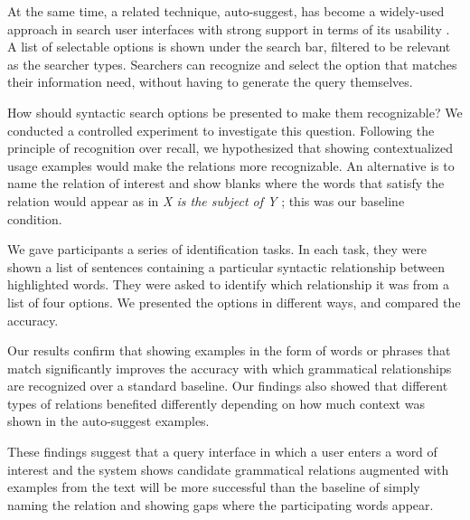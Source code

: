 At the same time, a related technique, auto-suggest, has become a widely-used approach in search user interfaces with strong support in terms of its usability \cite{hearst2009search}. A list of selectable options is shown under the search bar, filtered to be relevant as the searcher types. Searchers can recognize and select the option that matches their information need, without having to generate the query themselves.

How should syntactic search options be presented to make them recognizable? We conducted a controlled experiment to investigate this question. Following the principle of recognition over recall, we hypothesized that showing contextualized usage examples would make the relations more recognizable. An alternative is to name the relation of interest and show blanks where the words that satisfy the relation would appear as in \emph{X is the subject of Y} \cite{muralidharan2013supporting}; this was our baseline condition.

We gave participants a series of identification tasks. In each task, they were shown a list of sentences containing a particular syntactic relationship between highlighted words. They were asked to identify which relationship it was from a list of four options. We presented the options in different ways, and compared the accuracy.

Our results confirm that showing examples in the form of words or phrases that match significantly improves the accuracy with which grammatical relationships are recognized over a standard baseline.  Our findings also showed that different types of relations benefited differently depending on how much context was shown in the auto-suggest examples.

These findings suggest that a query interface in which a user enters a word of interest and the system shows candidate grammatical relations augmented with examples from the text will be more successful than the baseline of simply naming the relation and showing gaps where the participating words appear.

